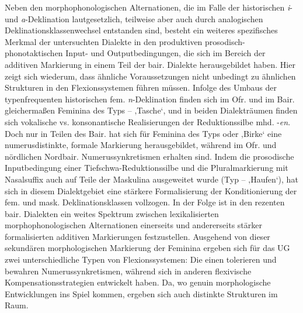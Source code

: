 \begin{sloppypar}
Neben den morphophonologischen Alternationen, die im Falle der historischen \textit{i}{}- und \textit{a}{}-Deklination lautgesetzlich, teilweise aber auch durch analogischen Deklinationsklassenwechsel entstanden sind, besteht ein weiteres spezifisches Merkmal der untersuchten Dialekte in den produktiven prosodisch-phonotaktischen Input- und Outputbedingungen, die sich im Bereich der additiven Markierung in einem Teil der bair. Dialekte herausgebildet haben. Hier zeigt sich wiederum, dass ähnliche Voraussetzungen nicht unbedingt zu ähnlichen Strukturen in den Flexionssystemen führen müssen. Infolge des Umbaus der typenfrequenten historischen fem. \textit{n}{}-Deklination finden sich im Ofr. und im Bair. gleichermaßen Feminina des Typs  --  ‚Tasche‘, und in beiden Dialekträumen finden sich vokalische vs. konsonantische Realisierungen der Reduktionssilbe mhd. -\textit{en}. Doch nur in Teilen des Bair. hat sich für Feminina des Typs  oder  ‚Birke‘ eine numerusdistinkte, formale Markierung herausgebildet, während im Ofr. und nördlichen Nordbair. Numerussynkretismen erhalten sind. Indem die prosodische Inputbedingung einer Tiefschwa-Reduktionssilbe und die Pluralmarkierung mit Nasalsuffix auch auf Teile der Maskulina ausgeweitet wurde (Typ  --  ‚Haufen‘), hat sich in diesem Dialektgebiet eine stärkere Formalisierung der Konditionierung der fem. und mask. Deklinationsklassen vollzogen. In der Folge ist in den rezenten bair. Dialekten ein weites Spektrum zwischen lexikalisierten morphophonologischen Alternationen einerseits und andererseits stärker formalisierten additiven Markierungen festzustellen. Ausgehend von dieser sekundären morphologischen Markierung der Feminina ergeben sich für das UG zwei unterschiedliche Typen von Flexionssystemen: Die einen tolerieren und bewahren Numerussynkretismen, während sich in anderen flexivische Kompensationsstrategien entwickelt haben. Da, wo genuin morphologische Entwicklungen ins Spiel kommen, ergeben sich auch distinkte Strukturen im Raum.
\end{sloppypar}

